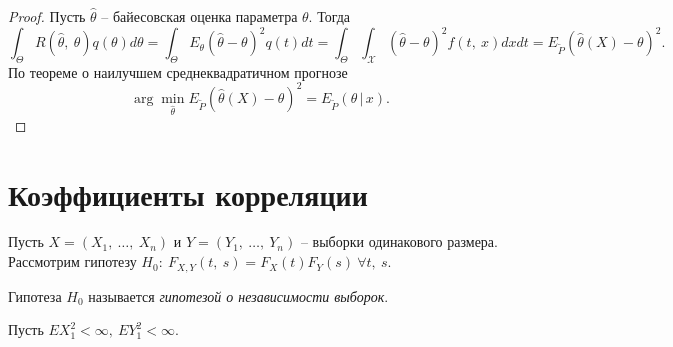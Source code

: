 \begin{proof}
    Пусть $\displaystyle \hat{\theta }$ -- байесовская оценка параметра $\displaystyle \theta $. Тогда
    \begin{equation*}
        \int _{\Theta } R(\hat{\theta } ,\ \theta) q( \theta ) d\theta =\int _{\Theta } E_{\theta }(\hat{\theta } -\theta )^{2} q( t) dt=\int _{\Theta }\int _{\mathcal{X}}(\hat{\theta } -\theta )^{2} f( t,\ x) dxdt=E_{\tilde{P}}(\hat{\theta }( X) -\theta )^{2} .
    \end{equation*}
    По теореме о наилучшем среднеквадратичном прогнозе
    \begin{equation*}
        \arg\min_{\hat{\theta}}E_{\tilde{P}}(\hat{\theta }( X) -\theta )^{2} = E_{\tilde{P}}(\theta\, \vert\, x).
    \end{equation*}
\end{proof}
\section{Коэффициенты корреляции}

Пусть $\displaystyle X=( X_{1} ,\ \dotsc ,\ X_{n})$ и $\displaystyle Y=( Y_{1} ,\ \dotsc ,\ Y_{n})$ -- выборки одинакового размера. Рассмотрим гипотезу $\displaystyle H_{0} :\ F_{X,Y}( t,\ s) =F_{X}( t) F_{Y}( s) \ \forall t,\ s$.
\begin{definition}
    Гипотеза $\displaystyle H_{0}$ называется \textit{гипотезой о независимости выборок}.
\end{definition}
Пусть $\displaystyle EX_{1}^{2} < \infty ,\ EY_{1}^{2} < \infty $.
